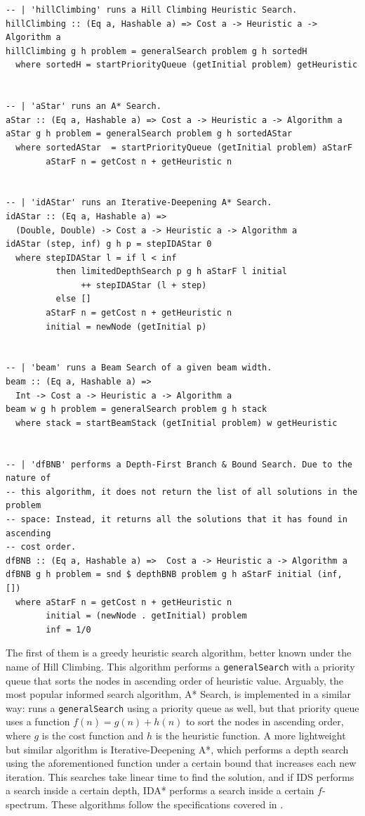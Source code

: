 \begin{lstlisting}[style=haskell, caption=Pure informed search algorithms,
label=pure:inf]
-- | 'hillClimbing' runs a Hill Climbing Heuristic Search.
hillClimbing :: (Eq a, Hashable a) => Cost a -> Heuristic a -> Algorithm a
hillClimbing g h problem = generalSearch problem g h sortedH
  where sortedH = startPriorityQueue (getInitial problem) getHeuristic


-- | 'aStar' runs an A* Search.
aStar :: (Eq a, Hashable a) => Cost a -> Heuristic a -> Algorithm a
aStar g h problem = generalSearch problem g h sortedAStar
  where sortedAStar  = startPriorityQueue (getInitial problem) aStarF
        aStarF n = getCost n + getHeuristic n


-- | 'idAStar' runs an Iterative-Deepening A* Search.
idAStar :: (Eq a, Hashable a) =>
  (Double, Double) -> Cost a -> Heuristic a -> Algorithm a
idAStar (step, inf) g h p = stepIDAStar 0
  where stepIDAStar l = if l < inf
          then limitedDepthSearch p g h aStarF l initial
               ++ stepIDAStar (l + step)
          else []
        aStarF n = getCost n + getHeuristic n
        initial = newNode (getInitial p)


-- | 'beam' runs a Beam Search of a given beam width.
beam :: (Eq a, Hashable a) =>
  Int -> Cost a -> Heuristic a -> Algorithm a
beam w g h problem = generalSearch problem g h stack
  where stack = startBeamStack (getInitial problem) w getHeuristic


-- | 'dfBNB' performs a Depth-First Branch & Bound Search. Due to the nature of
-- this algorithm, it does not return the list of all solutions in the problem
-- space: Instead, it returns all the solutions that it has found in ascending
-- cost order.
dfBNB :: (Eq a, Hashable a) =>  Cost a -> Heuristic a -> Algorithm a
dfBNB g h problem = snd $ depthBNB problem g h aStarF initial (inf, [])
  where aStarF n = getCost n + getHeuristic n
        initial = (newNode . getInitial) problem
        inf = 1/0
\end{lstlisting}


The first of them is a greedy heuristic search algorithm, better known under
the name of Hill Climbing. This algorithm performs a \texttt{generalSearch}
with a priority queue that sorts the nodes in ascending order of heuristic
value. Arguably, the most popular informed search algorithm, A* Search, is
implemented in a similar way: runs a \texttt{generalSearch} using a priority
queue as well, but that priority queue uses a function $f(n) = g(n) +
h(n)$ to sort the nodes in ascending order, where $g$ is the cost function and
$h$ is the heuristic function. A more lightweight but similar algorithm is
Iterative-Deepening A*, which performs a depth search using the aforementioned
function under a certain bound that increases each new iteration. This searches
take linear time to find the solution, and if IDS performs a search inside a
certain depth, IDA* performs a search inside a certain $f$-spectrum. These
algorithms follow the specifications covered in \cite{rusell-2003-aima}.\\


